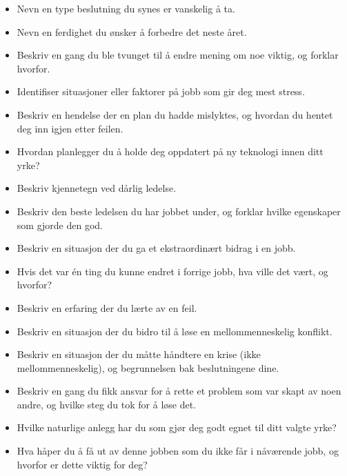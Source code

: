 \begin{itemize}
\item{} Nevn en type beslutning du synes er vanskelig å ta.
\item{} Nevn en ferdighet du ønsker å forbedre det neste året.
\item{} Beskriv en gang du ble tvunget til å endre mening om noe viktig, og forklar hvorfor.
\item{} Identifiser situasjoner eller faktorer på jobb som gir deg mest stress.
\item{} Beskriv en hendelse der en plan du hadde mislyktes, og hvordan du hentet deg inn igjen etter feilen.
\item{} Hvordan planlegger du å holde deg oppdatert på ny teknologi innen ditt yrke?
\item{} Beskriv kjennetegn ved dårlig ledelse.
\item{} Beskriv den beste ledelsen du har jobbet under, og forklar hvilke egenskaper som gjorde den god.
\item{} Beskriv en situasjon der du ga et ekstraordinært bidrag i en jobb.
\item{} Hvis det var én ting du kunne endret i forrige jobb, hva ville det vært, og hvorfor?
\item{} Beskriv en erfaring der du lærte av en feil.
\item{} Beskriv en situasjon der du bidro til å løse en mellommenneskelig konflikt.
\item{} Beskriv en situasjon der du måtte håndtere en krise (ikke mellommenneskelig), og begrunnelsen bak beslutningene dine.
\item{} Beskriv en gang du fikk ansvar for å rette et problem som var skapt av noen andre, og hvilke steg du tok for å løse det.
\item{} Hvilke naturlige anlegg har du som gjør deg godt egnet til ditt valgte yrke?
\item{} Hva håper du å få ut av denne jobben som du ikke får i nåværende jobb, og hvorfor er dette viktig for deg?
\end{itemize}




